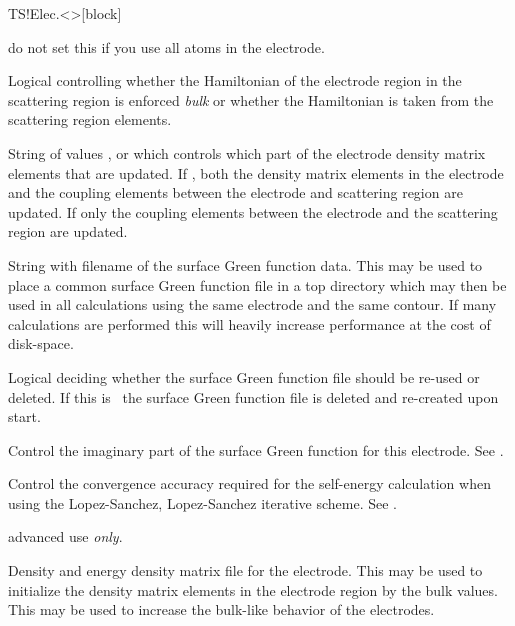 \begin{fdfentry}{TS!Elec.<>}[block]
\begin{fdfoptions}
    \note do not set this if you use all atoms in the electrode.

    \option[Bulk]%
    Logical controlling whether the Hamiltonian of the electrode
    region in the scattering region is enforced \emph{bulk} or whether
    the Hamiltonian is taken from the scattering region elements.

    \option[DM-update]%
    String of values ,  or 
    which controls which part of the electrode density matrix elements
    that are updated. If , both the density matrix elements
    in the electrode and the coupling elements between the 
    electrode and scattering region are updated. If 
    only the coupling elements between the electrode and the
    scattering region are updated.

    \option[Gf]%
    String with filename of the surface Green function data. This may
    be used to place a common surface Green function file in a top
    directory which may then be used in all calculations using the
    same electrode and the same contour. 
    If many calculations are performed this will heavily increase
    performance at the cost of disk-space.

    \option[Gf-Reuse]%
    Logical deciding whether the surface Green function file should be
    re-used or deleted.
    If this is \fdffalse\ the surface Green function file is deleted
    and re-created upon start.
    
    \option[Eta]%
    Control the imaginary part of the surface Green function for this
    electrode. See .

    \option[Accuracy]%
    Control the convergence accuracy required for the self-energy
    calculation when using the Lopez-Sanchez, Lopez-Sanchez iterative
    scheme. 
    See .

    \note advanced use \emph{only}.
    
    \option[DE]%
    Density and energy density matrix file for the electrode. This may
    be used to initialize the density matrix elements in the electrode
    region by the bulk values. This may be used to increase the
    bulk-like behavior of the electrodes. 


\end{fdfoptions}
\end{fdfentry}

